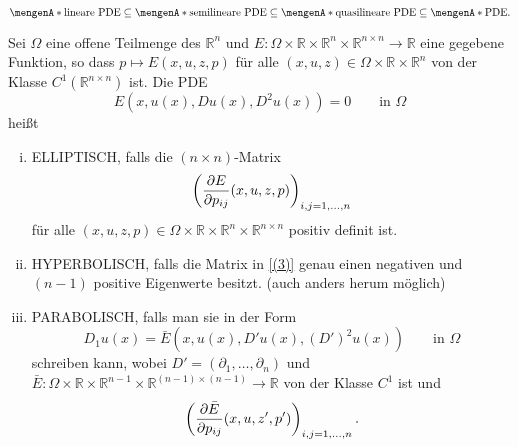 \begin{bemerkung}
	\[
		\set{\text{lineare PDE}} \subseteq \set{\text{semilineare PDE}} \subseteq \set{\text{quasilineare PDE}} \subseteq \set{\text{PDE}}.
	\]
\end{bemerkung}

\begin{definition}
		Sei $\Omega$ eine offene Teilmenge des $\mathbb{R}^n$ und $E: \Omega \times \mathbb{R} \times \mathbb{R}^n \times \mathbb{R}^{n \times n} \to \mathbb{R}$ eine gegebene Funktion, so dass $p \mapsto E(x,u,z,p)$ für alle $(x,u,z) \in \Omega \times \mathbb{R}\times \mathbb{R}^n$ von der Klasse $C^1(\mathbb{R}^{n \times n})$ ist. Die PDE
		\begin{equation}
			E(x,u(x),Du(x),D^2u(x))=0 \qquad \text{in }\Omega 
		\end{equation}
		heißt
		\begin{enumerate}[(i)]
			\item ELLIPTISCH, falls die $(n \times n)$-Matrix 
			\begin{equation}
				\left( \frac{{\partial E}}{{\partial p_{ij}}} (x,u,z,p) \right)_{i,j=1,\dots,n} \label{(3)}
			\end{equation}
			für alle $(x,u,z,p) \in \Omega \times \mathbb{R} \times \mathbb{R}^n \times \mathbb{R}^{n \times n}$ positiv definit ist.
			\item HYPERBOLISCH, falls die Matrix in \eqref{(3)} genau einen negativen und $(n-1)$ positive Eigenwerte besitzt. (auch anders herum möglich)
			\item PARABOLISCH, falls man sie in der Form
			\begin{equation}
				D_1u(x)= \bar{E}(x,u(x),D'u(x),(D')^2u(x)) \qquad \text{in } \Omega
			\end{equation}
			schreiben kann, wobei $D'=(\partial_1,\dots,\partial_n)$ und $\bar{E}: \Omega \times \mathbb{R} \times \mathbb{R}^{n-1} \times \mathbb{R}^{(n-1) \times (n-1)} \to \mathbb{R}$
			von der Klasse $C^1$ ist und 
			\begin{equation}
				\left( \frac{{\partial \bar{E}}}{{\partial p_{ij}}} (x,u,z',p') \right)_{i,j=1,\dots,n}.
			\end{equation}
		\end{enumerate}
\end{definition}

